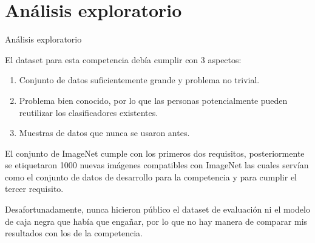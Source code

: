 \documentclass[10pt]{beamer}
\begin{document}
\section{Análisis exploratorio}
\begin{frame}{Análisis exploratorio}
\justify	
\small

El dataset para esta competencia debía cumplir con 3 aspectos:

\begin{enumerate}
\item Conjunto de datos suficientemente grande y problema no trivial.
\item Problema bien conocido, por lo que las personas potencialmente pueden reutilizar los clasificadores existentes.
\item Muestras de datos que nunca se usaron antes.
\end{enumerate}

El conjunto de ImageNet cumple con los primeros dos requisitos, posteriormente se etiquetaron 1000 nuevas imágenes compatibles con ImageNet las cuales servían como el conjunto de datos de desarrollo para la competencia y para cumplir el tercer requisito. \medskip

Desafortunadamente, nunca hicieron público el dataset de evaluación ni el modelo de caja negra que había que engañar, por lo que no hay manera de comparar mis resultados con los de la competencia.

\end{frame}
\end{document}
